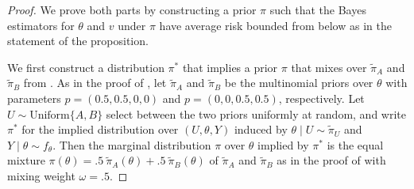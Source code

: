 \documentclass[12pt,reqno]{amsart}
\begin{document}
\begin{proof}

    We prove both parts by constructing a prior $\pi$ such that the Bayes estimators for $\theta$ and $v$ under $\pi$ have average risk bounded from below as in the statement of the proposition.

    We first construct a distribution $\pi^*$ that implies a prior $\pi$ that mixes over $\tilde{\pi}_A$ and $\tilde{\pi}_B$ from .
    As in the proof of , let $\tilde{\pi}_A$ and $\tilde{\pi}_B$ be the multinomial priors over $\theta$ with parameters $p = (0.5,0.5,0,0)$ and $p = (0,0,0.5,0.5)$, respectively.
    Let $U \sim \text{Uniform}\{A,B\}$ select between the two priors uniformly at random, and write $\pi^*$ for the implied distribution over $(U,\theta,Y)$ induced by $\theta \mid U \sim \tilde{\pi}_U$ and $Y \mid \theta \sim f_\theta$.
    Then the marginal distribution $\pi$ over $\theta$ implied by $\pi^*$ is the equal mixture $\pi(\theta) = .5 \: \tilde{\pi}_A(\theta) + .5 \: \tilde{\pi}_B(\theta)$ of $\tilde{\pi}_A$ and $\tilde{\pi}_B$ as in the proof of  with mixing weight $\omega = .5$.


\end{proof}
\end{document}
